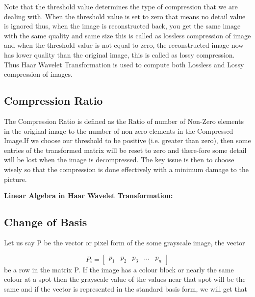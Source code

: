 \documentclass{article}
\begin{document}
\setlength{\parindent}{1cm}
Note that the threshold value determines the type of compression that we are dealing with. When the threshold value is set to zero that means no detail value is ignored thus, when the image is reconstructed back, you get the same image with the same quality and same size this is called as lossless compression of image and when the threshold value is not equal to zero, the reconstructed image now has lower quality than the original image, this is called as lossy compression.  Thus Haar Wavelet Transformation is used to compute both Lossless and Lossy compression of images.

\subsection*{\normalsize\textbf{Compression Ratio}}

\setlength{\parindent}{1cm}
The Compression Ratio is defined as the Ratio of number of Non-Zero elements in the original image to the number of non zero elements in the Compressed Image.If we choose our threshold to be positive (i.e. greater than zero), then some entries of the transformed matrix will be reset to zero and there-fore some detail will be lost when the image is decompressed. The key issue is then to choose  wisely so that the compression is done effectively with a minimum damage to the picture.

\begin{center}
  \large\textbf{Linear Algebra in Haar Wavelet Transformation:\\ }
\end{center}

\subsection*{\normalsize\textbf{Change of Basis}}
\setlength{\parindent}{1cm}
Let us say P be the vector or pixel form of the some grayscale image, the vector

\begin{equation*}
    P_i=\begin{bmatrix} p_1 & p_2 & p_3 & \ldots & p_n \end{bmatrix}
\end{equation*}
be a row in the matrix  P. If the image has a colour block or nearly the same colour at a spot then the grayscale value of the values near that spot will be the same and if the vector is represented in the standard basis form, we will get that
\end{document}
